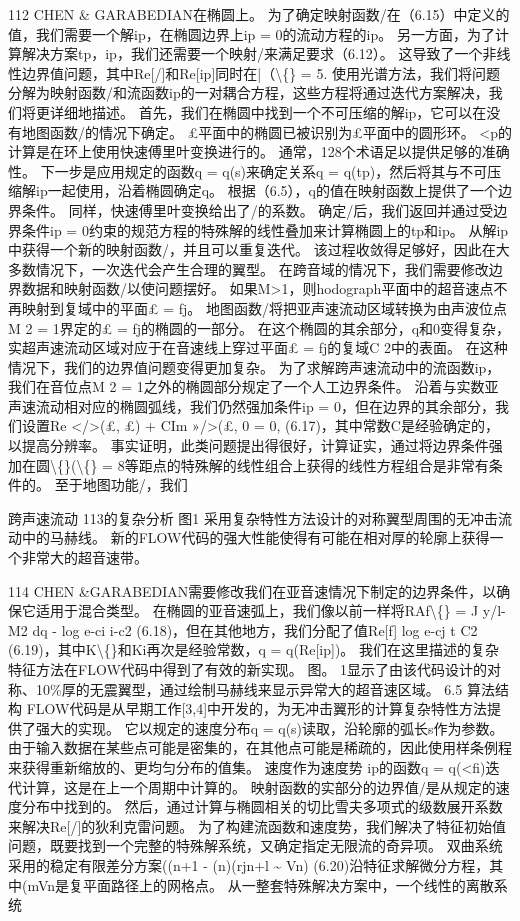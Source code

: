 \documentclass[UTF8,11pt,a4paper,openany,fontset=fandol]{ctexbook}
\begin{document}
112 CHEN \& GARABEDIAN在椭圆上。 为了确定映射函数/在（6.15）中定义的值，我们需要一个解ip，在椭圆边界上ip = 0的流动方程的ip。 另一方面，为了计算解决方案tp，ip，我们还需要一个映射/来满足要求（6.12）。 这导致了一个非线性边界值问题，其中Re[/]和Re[ip]同时在|（\textbackslash\{\} = 5. 使用光谱方法，我们将问题分解为映射函数/和流函数ip的一对耦合方程，这些方程将通过迭代方案解决，我们将更详细地描述。 首先，我们在椭圆中找到一个不可压缩的解ip，它可以在没有地图函数/的情况下确定。 £平面中的椭圆已被识别为£平面中的圆形环。 <p的计算是在环上使用快速傅里叶变换进行的。 通常，128个术语足以提供足够的准确性。 下一步是应用规定的函数q = q(s)来确定关系q = q(tp)，然后将其与不可压缩解ip一起使用，沿着椭圆确定q。 根据（6.5），q的值在映射函数上提供了一个边界条件。 同样，快速傅里叶变换给出了/的系数。 确定/后，我们返回并通过受边界条件ip = 0约束的规范方程的特殊解的线性叠加来计算椭圆上的tp和ip。 从解ip中获得一个新的映射函数/，并且可以重复迭代。 该过程收敛得足够好，因此在大多数情况下，一次迭代会产生合理的翼型。 在跨音域的情况下，我们需要修改边界数据和映射函数/以使问题摆好。 如果M>1，则hodograph平面中的超音速点不再映射到复域中的平面£ = fj。 地图函数/将把亚声速流动区域转换为由声波位点M 2 = 1界定的£ = fj的椭圆的一部分。 在这个椭圆的其余部分，q和0变得复杂，实超声速流动区域对应于在音速线上穿过平面£ = fj的复域C 2中的表面。 在这种情况下，我们的边界值问题变得更加复杂。 为了求解跨声速流动中的流函数ip，我们在音位点M 2 = 1之外的椭圆部分规定了一个人工边界条件。 沿着与实数亚声速流动相对应的椭圆弧线，我们仍然强加条件ip = 0，但在边界的其余部分，我们设置Re </>(£, £) + CIm »/>(£, 0 = 0, (6.17)，其中常数C是经验确定的，以提高分辨率。 事实证明，此类问题提出得很好，计算证实，通过将边界条件强加在圆\textbackslash\{\}(\textbackslash\{\} = 8等距点的特殊解的线性组合上获得的线性方程组合是非常有条件的。 至于地图功能/，我们

跨声速流动 113的复杂分析 图1 采用复杂特性方法设计的对称翼型周围的无冲击流动中的马赫线。 新的FLOW代码的强大性能使得有可能在相对厚的轮廓上获得一个非常大的超音速带。

114 CHEN \&GARABEDIAN需要修改我们在亚音速情况下制定的边界条件，以确保它适用于混合类型。 在椭圆的亚音速弧上，我们像以前一样将RAf\textbackslash\{\} = J y/l-M2 dq - log e-ci i-c2 (6.18)，但在其他地方，我们分配了值Re[f] log e-cj t C2 (6.19)，其中K\textbackslash\{\}和Ki再次是经验常数，q = q(Re[ip])。 我们在这里描述的复杂特征方法在FLOW代码中得到了有效的新实现。 图。 1显示了由该代码设计的对称、10\%厚的无震翼型，通过绘制马赫线来显示异常大的超音速区域。 6.5 算法结构 FLOW代码是从早期工作[3,4]中开发的，为无冲击翼形的计算复杂特性方法提供了强大的实现。 它以规定的速度分布q = q(s)读取，沿轮廓的弧长s作为参数。 由于输入数据在某些点可能是密集的，在其他点可能是稀疏的，因此使用样条例程来获得重新缩放的、更均匀分布的值集。 速度作为速度势 ip的函数q = q(<fi)迭代计算，这是在上一个周期中计算的。 映射函数的实部分的边界值/是从规定的速度分布中找到的。 然后，通过计算与椭圆相关的切比雪夫多项式的级数展开系数来解决Re[/]的狄利克雷问题。 为了构建流函数和速度势，我们解决了特征初始值问题，既要找到一个完整的特殊解系统，又确定指定无限流的奇异项。 双曲系统采用的稳定有限差分方案((n+1 - (n)(rjn+l \textasciitilde{} Vn) (6.20)沿特征求解微分方程，其中(mVn是复平面路径上的网格点。 从一整套特殊解决方案中，一个线性的离散系统
\end{document}
